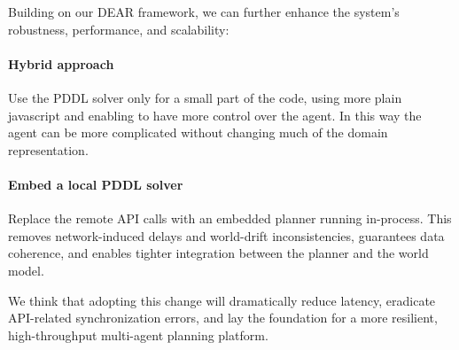 Building on our DEAR framework, we can further enhance the system’s robustness, performance, and scalability:

\paragraph{Hybrid approach}
    Use the PDDL solver only for a small part of the code, using more plain javascript and enabling to have more control over the agent.
    In this way the agent can be more complicated without changing much of the domain representation.

\paragraph{Embed a local PDDL solver} 
    Replace the remote API calls with an embedded planner running in-process.  
    This removes network-induced delays and world-drift inconsistencies, guarantees data coherence, and enables tighter integration between the planner and the world model.

\vspace{0.7cm}
We think that  adopting this change will dramatically reduce latency, eradicate API-related synchronization errors, and lay the foundation for a more resilient, high-throughput multi-agent planning platform.